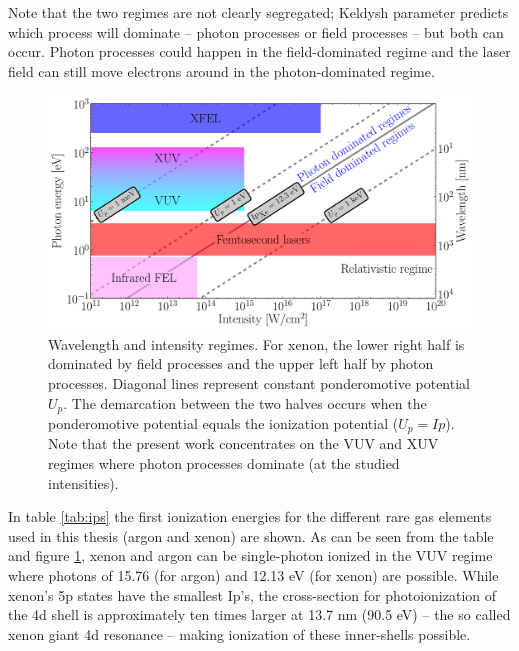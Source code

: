 Note that the two regimes are not clearly segregated; Keldysh parameter
predicts which process will dominate -- photon processes or field processes --
but both can occur. Photon processes could happen in the field-dominated
regime and the laser field can still move electrons around in the photon-dominated regime.

\begin{figure}
\centering
\includegraphics[width=\figurewidth]{figures/regimes}
\caption{Wavelength and intensity regimes. For xenon, the lower right half is dominated
         by field processes and the upper left half by photon processes. Diagonal
         lines represent constant ponderomotive potential $U_p$. The
         demarcation between the two halves occurs when the ponderomotive
         potential equals the ionization potential ($U_p = Ip$).
         Note that the present work concentrates on the VUV and XUV regimes
         where photon processes dominate (at the studied intensities).}
\label{fig:regimes}
\end{figure}

In table \ref{tab:ips} the first ionization energies for the different
rare gas elements used in this thesis (argon and xenon) are shown. As can be
seen from the table and figure \ref{fig:regimes}, xenon and argon can be
single-photon ionized in the VUV regime where photons of 15.76 (for argon)
and 12.13 eV (for xenon) are possible. While xenon's 5p states have the smallest
Ip's, the cross-section for photoionization of the 4d shell is approximately ten
times larger at 13.7 nm (90.5 eV) -- the so called xenon giant 4d
resonance\cite{Becker1986} -- making ionization of these inner-shells
possible\cite{Thomas2009,Ackad2013}.

